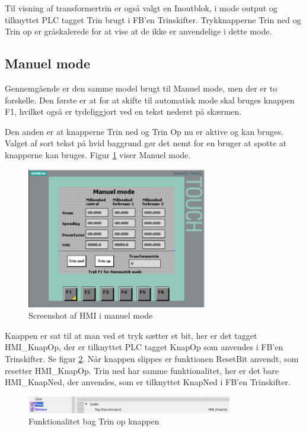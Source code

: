 Til visning af transformertrin er også valgt en Inoutblok, i mode output og tilknyttet PLC tagget Trin brugt i FB'en Trinskifter. Trykknapperne Trin ned og Trin op er gråskalerede for at vise at de ikke er anvendelige i dette mode.

\subsection{Manuel mode}

Gennemgående er den samme model brugt til Manuel mode, men der er to forskelle. Den første er at for at skifte til automatisk mode skal bruges knappen F1, hvilket også er tydeliggjort ved en tekst nederst på skærmen.


Den anden er at knapperne Trin ned og Trin Op nu er aktive og kan bruges. Valget af sort tekst på hvid baggrund gør det nemt for en bruger at spotte at knapperne kan bruges. Figur \ref{fig:HMIManuelModeDesign} viser Manuel mode.

\begin{figure}[H] %
	\centering
	\includegraphics[width=0.7\textwidth]{Figure/HMIManuelModeDesign}
	\caption{Screenshot af HMI i manuel mode}
	\label{fig:HMIManuelModeDesign}
\end{figure}

Knappen er sat til at man ved et tryk sætter et bit, her er det tagget HMI\_KnapOp, der er tilknyttet PLC tagget KnapOp som anvendes i FB'en Trinskifter. Se figur \ref{fig:HMITrinOp}. Når knappen slippes er funktionen ResetBit anvendt, som resetter HMI\_KnapOp. Trin ned har samme funktionalitet, her er det bare HMI\_KnapNed, der anvendes, som er tilknyttet KnapNed i FB'en Trinskifter.

\begin{figure}[H] %
	\centering
	\includegraphics[width=0.8\textwidth]{Figure/HMITrinOp}
	\caption{Funktionalitet bag Trin op knappen}
	\label{fig:HMITrinOp}
\end{figure}

